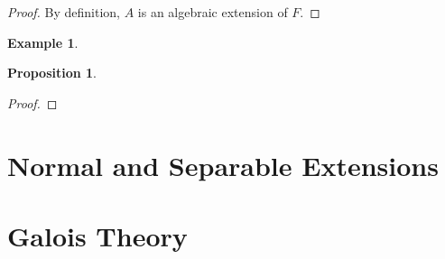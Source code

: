 \documentclass[draft]{article}
\newtheorem{prop}[thm]{Proposition}
\newtheorem{exmp}{Example}
\theoremstyle{definition}
\theoremstyle{remark}
\begin{document}
            \begin{proof}
                By definition, $A$ is an algebraic extension of $F$. 
            \end{proof}
            
            \begin{exmp}
            
            \end{exmp}
            
            \begin{prop}
                
            \end{prop}
            
            \begin{proof}
                
            \end{proof}
            
	\section{Normal and Separable Extensions}
	
	\section{Galois Theory}
	
\newpage

    \begin{thebibliography}{10}
    
    	\bibitem{}
    	
    \end{thebibliography}
	
\end{document}
